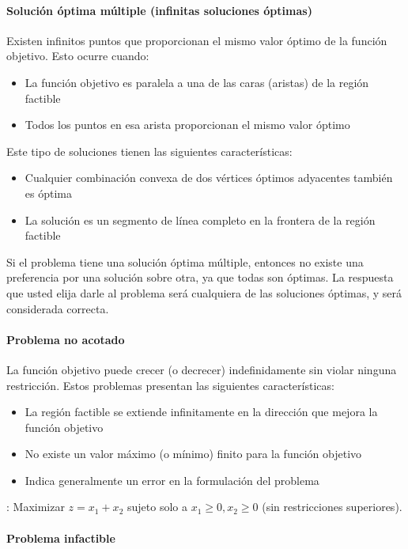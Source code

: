 \paragraph{Solución óptima múltiple (infinitas soluciones óptimas)}

Existen infinitos puntos que proporcionan el mismo valor óptimo de la función objetivo. Esto ocurre cuando:
\begin{itemize}
  \item La función objetivo es paralela a una de las caras (aristas) de la región factible
  \item Todos los puntos en esa arista proporcionan el mismo valor óptimo
\end{itemize}
Este tipo de soluciones tienen las siguientes características:
\begin{itemize}
  \item Cualquier combinación convexa de dos vértices óptimos adyacentes también es óptima
  \item La solución es un segmento de línea completo en la frontera de la región factible
\end{itemize}

Si el problema tiene una solución óptima múltiple, entonces no existe una preferencia por una solución sobre otra, ya que todas son óptimas. La respuesta que usted elija darle al problema será cualquiera de las soluciones óptimas, y será considerada correcta.

\paragraph{Problema no acotado}

La función objetivo puede crecer (o decrecer) indefinidamente sin violar ninguna restricción. Estos problemas presentan las siguientes características:
\begin{itemize}
  \item La región factible se extiende infinitamente en la dirección que mejora la función objetivo
  \item No existe un valor máximo (o mínimo) finito para la función objetivo
  \item Indica generalmente un error en la formulación del problema
\end{itemize}

\ejemplo : Maximizar \(z = x_1 + x_2\) sujeto solo a \(x_1 \geq 0, x_2 \geq 0\) (sin restricciones superiores).

\paragraph{Problema infactible}

